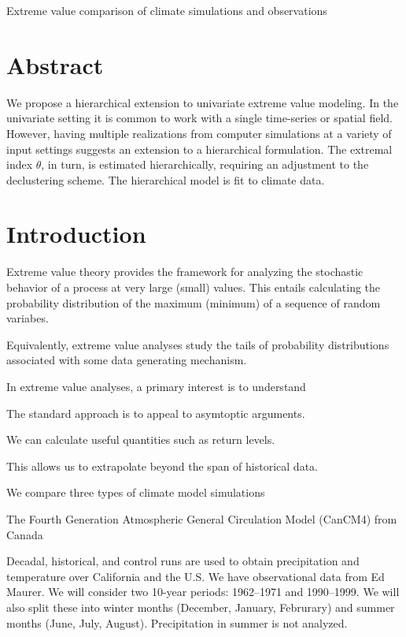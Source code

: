 \documentclass[12pt]{article}
\begin{document}
\begin{Large}
\noindent Extreme value comparison of climate simulations and observations
\end{Large}

\section{Abstract}

We propose a hierarchical extension to univariate extreme value modeling. In the univariate setting it is common to work with a single time-series or spatial field. However, having multiple realizations from computer simulations at a variety of input settings suggests an extension to a hierarchical formulation. The extremal index $\theta$, in turn, is estimated hierarchically, requiring an adjustment to the declustering scheme. The hierarchical model is fit to climate data.

\section{Introduction}



Extreme value theory provides the framework for analyzing the stochastic behavior of a process at very large (small) values. This entails calculating the probability distribution of the maximum (minimum) of a sequence of random variabes. 

Equivalently, extreme value analyses study the tails of probability distributions associated with some data generating mechanism. 

In extreme value analyses, a primary interest is to understand 

The standard approach is to appeal to asymtoptic arguments.

We can calculate useful quantities such as return levels.

This allows us to extrapolate beyond the span of historical data.


We compare three types of climate model simulations 

The Fourth Generation Atmospheric General Circulation Model (CanCM4) from Canada 

Decadal, historical, and control runs are used to obtain precipitation and temperature over California and the U.S. We have observational data from Ed Maurer. We will consider two 10-year periods: 1962--1971 and 1990--1999. We will also split these into winter months (December, January, Februrary) and summer months (June, July, August). Precipitation in summer is not analyzed.
\bigskip
\end{document}
